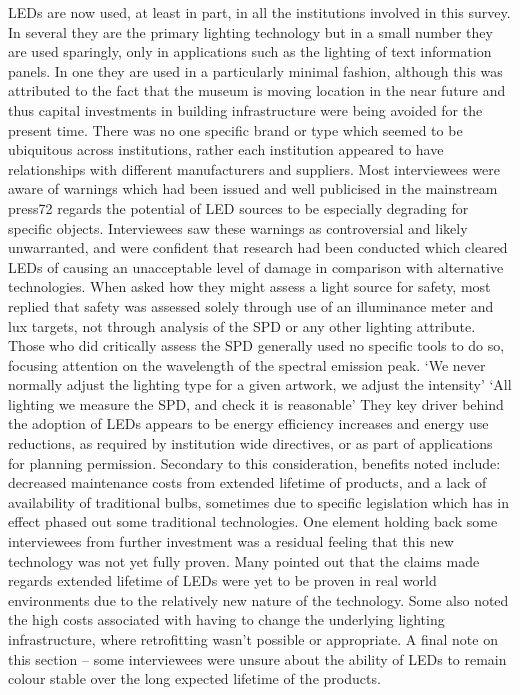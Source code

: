 LEDs are now used, at least in part, in all the institutions involved in this survey. In several they are the primary lighting technology but in a small number they are used sparingly, only in applications such as the lighting of text information panels. In one they are used in a particularly minimal fashion, although this was attributed to the fact that the museum is moving location in the near future and thus capital investments in building infrastructure were being avoided for the present time. There was no one specific brand or type which seemed to be ubiquitous across institutions, rather each institution appeared to have relationships with different manufacturers and suppliers.
Most interviewees were aware of warnings which had been issued and well publicised in the mainstream press72 regards the potential of LED sources to be especially degrading for specific objects. Interviewees saw these warnings as controversial and likely unwarranted, and were confident that research had been conducted which cleared LEDs of causing an unacceptable level of damage in comparison with alternative technologies. When asked how they might assess a light source for safety, most replied that safety was assessed solely through use of an illuminance meter and lux targets, not through analysis of the SPD or any other lighting attribute. Those who did critically assess the SPD generally used no specific tools to do so, focusing attention on the wavelength of the spectral emission peak.
`We never normally adjust the lighting type for a given artwork, we adjust the intensity'
`All lighting we measure the SPD, and check it is reasonable'
They key driver behind the adoption of LEDs appears to be energy efficiency increases and energy use reductions, as required by institution wide directives, or as part of applications for planning permission. Secondary to this consideration, benefits noted include: decreased maintenance costs from extended lifetime of products, and a lack of availability of traditional bulbs, sometimes due to specific legislation which has in effect phased out some traditional technologies. One element holding back some interviewees from further investment was a residual feeling that this new technology was not yet fully proven. Many pointed out that the claims made regards extended lifetime of LEDs were yet to be proven in real world environments due to the relatively new nature of the technology. Some also noted the high costs associated with having to change the underlying lighting infrastructure, where retrofitting wasn't possible or appropriate. A final note on this section – some interviewees were unsure about the ability of LEDs to remain colour stable over the long expected lifetime of the products.
